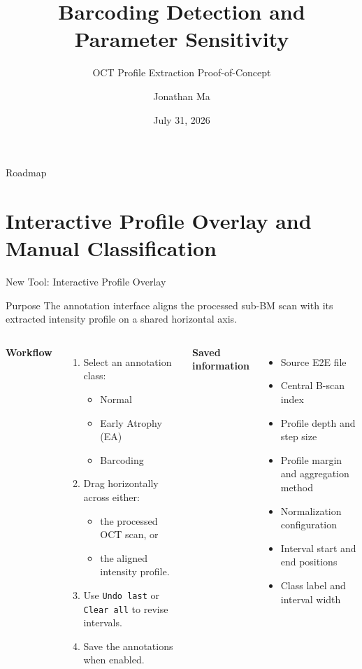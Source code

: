 \documentclass[aspectratio=169]{beamer}
\title[Barcoding Detection]{Barcoding Detection and Parameter Sensitivity}
\subtitle{OCT Profile Extraction Proof-of-Concept}
\author{Jonathan Ma}
\date{July 31, 2026}
\begin{document}
\begin{frame}
  \titlepage
\end{frame}

\begin{frame}{Roadmap}
  \tableofcontents
\end{frame}

\section{Interactive Profile Overlay and Manual Classification}

\begin{frame}{New Tool: Interactive Profile Overlay}

\begin{block}{Purpose}
The annotation interface aligns the processed sub-BM scan with its extracted
intensity profile on a shared horizontal axis.
\end{block}

\begin{columns}[T]


\textbf{Workflow}

\begin{enumerate}
    \item Select an annotation class:
    \begin{itemize}
        \item Normal
        \item Early Atrophy (EA)
        \item Barcoding
    \end{itemize}
    \item Drag horizontally across either:
    \begin{itemize}
        \item the processed OCT scan, or
        \item the aligned intensity profile.
    \end{itemize}
    \item Use \texttt{Undo last} or \texttt{Clear all} to revise intervals.
    \item Save the annotations when enabled.
\end{enumerate}


\textbf{Saved information}

\begin{itemize}
    \item Source E2E file
    \item Central B-scan index
    \item Profile depth and step size
    \item Profile margin and aggregation method
    \item Normalization configuration
    \item Interval start and end positions
    \item Class label and interval width
\end{itemize}

\end{columns}

\end{frame}
\end{document}
